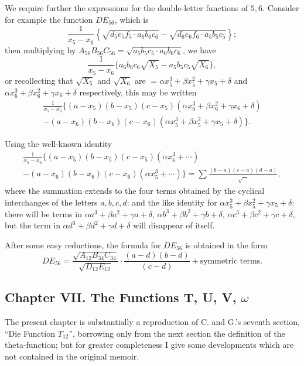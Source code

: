 \documentclass[11pt,a4paper]{book}
\begin{document}
\begin{art}
We require further the expressions for the double-letter functions of $5,6$. Consider for example the function $DE_{56}$, which is
\[
\frac{1}{x_5 - x_6}\left\{\sqrt{d_5 e_5 f_5 \cdot a_6 b_6 c_6} - \sqrt{d_6 e_6 f_6 \cdot a_5 b_5 c_5}\right\};
\]
then multiplying by $A_{56} B_{56} C_{56} = \sqrt{a_5 b_5 c_5 \cdot a_6 b_6 c_6}$, we have
\[
\frac{1}{x_5 - x_6}\{a_6 b_6 c_6 \sqrt{X_5} - a_5 b_5 c_5 \sqrt{X_6}\},
\]
or recollecting that $\sqrt{X_5}$ and $\sqrt{X_6}$ are $= \alpha x_5^3 + \beta x_5^2 + \gamma x_5 + \delta$ and $\alpha x_6^3 + \beta x_6^2 + \gamma x_6 + \delta$ respectively, this may be written
\begin{multline*}
\frac{1}{x_5 - x_6}\bigl\{(a-x_5)(b-x_5)(c-x_5)(\alpha x_6^3 + \beta x_6^2 + \gamma x_6 + \delta) \\
- (a-x_6)(b-x_6)(c-x_6)(\alpha x_5^3 + \beta x_5^2 + \gamma x_5 + \delta)\bigr\}.
\end{multline*}

Using the well-known identity
\begin{multline*}
\frac{1}{x_5 - x_6}\bigl\{(a-x_5)(b-x_5)(c-x_5)(\alpha x_6^3 + \cdots) \\
- (a-x_6)(b-x_6)(c-x_6)(\alpha x_5^3 + \cdots)\bigr\} = \sum \frac{(b-a)(c-a)(d-a)}{\sqrt{\cdots}},
\end{multline*}
where the summation extends to the four terms obtained by the cyclical interchanges of the letters $a,b,c,d$: and the like identity for $\alpha x_5^3 + \beta x_5^2 + \gamma x_5 + \delta$: there will be terms in $\alpha a^3 + \beta a^2 + \gamma a + \delta$, $\alpha b^3 + \beta b^2 + \gamma b + \delta$, $\alpha c^3 + \beta c^2 + \gamma c + \delta$, but the term in $\alpha d^3 + \beta d^2 + \gamma d + \delta$ will disappear of itself.

After some easy reductions, the formula for $DE_{56}$ is obtained in the form
\[
DE_{56} = \frac{\sqrt{A_{12} B_{34} C_{34}}}{\sqrt{D_{12} E_{12}}} \cdot \frac{(a-d)(b-d)}{(c-d)} + \text{symmetric terms}.
\]
\end{art}

\newpage
\subsection*{Chapter VII. The Functions T, U, V, $\omega$}

The present chapter is substantially a reproduction of C. and G.'s seventh section, ``Die Function $T_{12}$'', borrowing only from the next section the definition of the theta-function; but for greater completeness I give some developments which are not contained in the original memoir.
\end{document}
